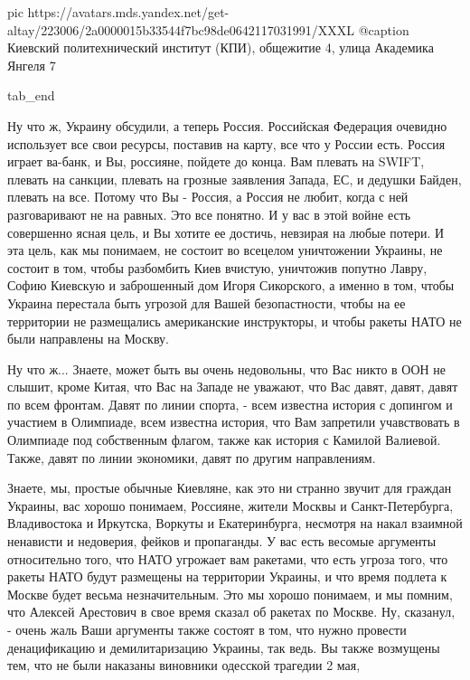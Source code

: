 		 pic https://avatars.mds.yandex.net/get-altay/223006/2a0000015b33544f7bc98de0642117031991/XXXL
		 @caption Киевский политехнический институт (КПИ), общежитие 4, улица Академика Янгеля 7

  tab_end
\fi

Ну что ж, Украину обсудили, а теперь Россия. Российская Федерация очевидно
использует все свои ресурсы, поставив на карту, все что у России есть. Россия
играет ва-банк, и Вы, россияне, пойдете до конца. Вам плевать на SWIFT, плевать
на санкции, плевать на грозные заявления Запада, ЕС, и дедушки Байден, плевать
на все. Потому что Вы - Россия, а Россия не любит, когда с ней разговаривают не
на равных. Это все понятно. И у вас в этой войне есть  совершенно ясная цель, и
Вы хотите ее достичь, невзирая на любые потери. И эта цель, как мы понимаем, не
состоит во всецелом уничтожении Украины, не состоит в том, чтобы разбомбить
Киев вчистую, уничтожив попутно Лавру, Софию Киевскую и заброшенный дом Игоря
Сикорского, а именно в том, чтобы Украина перестала быть угрозой для Вашей
безопастности, чтобы на ее территории не размещались американские инструкторы,
и чтобы ракеты НАТО не были направлены на Москву. 

Ну что ж... Знаете, может быть вы очень недовольны, что Вас никто в ООН не
слышит, кроме Китая, что Вас на Западе не уважают, что Вас давят, давят, давят
по всем фронтам. Давят по линии спорта, - всем известна история с допингом и
участием в Олимпиаде, всем известна история, что Вам запретили учавствовать в
Олимпиаде под собственным флагом,  также как история с Камилой Валиевой. Также,
давят по линии экономики, давят по другим направлениям.

Знаете, мы, простые обычные Киевляне, как это ни странно звучит для граждан
Украины, вас хорошо понимаем, Россияне, жители Москвы и Санкт-Петербурга,
Владивостока и Иркутска, Воркуты и Екатеринбурга, несмотря на накал взаимной
ненависти и недоверия, фейков и пропаганды. У вас есть весомые аргументы
относительно того, что НАТО угрожает вам ракетами, что есть угроза того, что
ракеты НАТО будут размещены на территории Украины, и что время подлета к Москве
будет весьма незначительным.  Это мы хорошо понимаем, и мы помним, что Алексей
Арестович в свое время сказал об ракетах по Москве. Ну, сказанул, - очень жаль
Ваши аргументы также состоят в том, что нужно провести денацификацию и
демилитаризацию Украины, так ведь. Вы также возмущены тем, что не были наказаны
виновники одесской трагедии 2 мая, 
